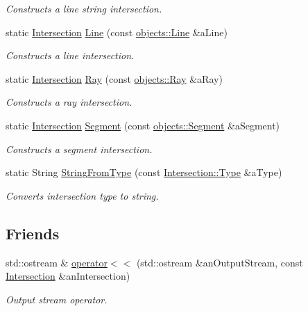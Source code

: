 \begin{DoxyCompactItemize}
\begin{DoxyCompactList}\small\item\em Constructs a line string intersection. \end{DoxyCompactList}\item 
static \hyperlink{classlibrary_1_1math_1_1geom_1_1d3_1_1_intersection}{Intersection} \hyperlink{classlibrary_1_1math_1_1geom_1_1d3_1_1_intersection_a3f099c46287b3dfb2e51c26b73fe0f8e}{Line} (const \hyperlink{classlibrary_1_1math_1_1geom_1_1d3_1_1objects_1_1_line}{objects\+::\+Line} \&a\+Line)
\begin{DoxyCompactList}\small\item\em Constructs a line intersection. \end{DoxyCompactList}\item 
static \hyperlink{classlibrary_1_1math_1_1geom_1_1d3_1_1_intersection}{Intersection} \hyperlink{classlibrary_1_1math_1_1geom_1_1d3_1_1_intersection_a1a1ca8a76e8d4ea2cd9435268b5a87d1}{Ray} (const \hyperlink{classlibrary_1_1math_1_1geom_1_1d3_1_1objects_1_1_ray}{objects\+::\+Ray} \&a\+Ray)
\begin{DoxyCompactList}\small\item\em Constructs a ray intersection. \end{DoxyCompactList}\item 
static \hyperlink{classlibrary_1_1math_1_1geom_1_1d3_1_1_intersection}{Intersection} \hyperlink{classlibrary_1_1math_1_1geom_1_1d3_1_1_intersection_af927ab821d40f12d5dd571316c6262ab}{Segment} (const \hyperlink{classlibrary_1_1math_1_1geom_1_1d3_1_1objects_1_1_segment}{objects\+::\+Segment} \&a\+Segment)
\begin{DoxyCompactList}\small\item\em Constructs a segment intersection. \end{DoxyCompactList}\item 
static String \hyperlink{classlibrary_1_1math_1_1geom_1_1d3_1_1_intersection_a7294c6aa40d2353f1f4d7d6019c9dbdc}{String\+From\+Type} (const \hyperlink{classlibrary_1_1math_1_1geom_1_1d3_1_1_intersection_a3465d607fd42380f350598e055271b05}{Intersection\+::\+Type} \&a\+Type)
\begin{DoxyCompactList}\small\item\em Converts intersection type to string. \end{DoxyCompactList}\end{DoxyCompactItemize}
\subsection*{Friends}
\begin{DoxyCompactItemize}
\item 
std\+::ostream \& \hyperlink{classlibrary_1_1math_1_1geom_1_1d3_1_1_intersection_a8ff783039001be6a871338148f4f2919}{operator$<$$<$} (std\+::ostream \&an\+Output\+Stream, const \hyperlink{classlibrary_1_1math_1_1geom_1_1d3_1_1_intersection}{Intersection} \&an\+Intersection)
\begin{DoxyCompactList}\small\item\em Output stream operator. \end{DoxyCompactList}\end{DoxyCompactItemize}


